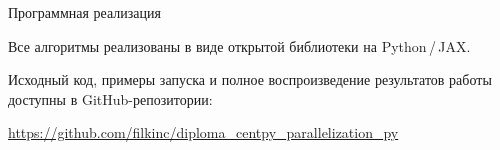 \documentclass[ignoreonframetext,unicode,aspectratio=169]{beamer}
\begin{document}
\begin{frame}{Программная реализация}
	\centering
	\vspace{0.3cm}
	
	Все алгоритмы реализованы в виде открытой библиотеки на Python\,/\,JAX.
	
	\vspace{0.25cm}
	Исходный код, примеры запуска и полное воспроизведение результатов
		работы доступны в GitHub-репозитории:
	
	\vspace{0.5cm}
	
	\vspace{0.5cm}
	{\large\url{https://github.com/filkinc/diploma_centpy_parallelization_py}}
\end{frame}


\end{document}
